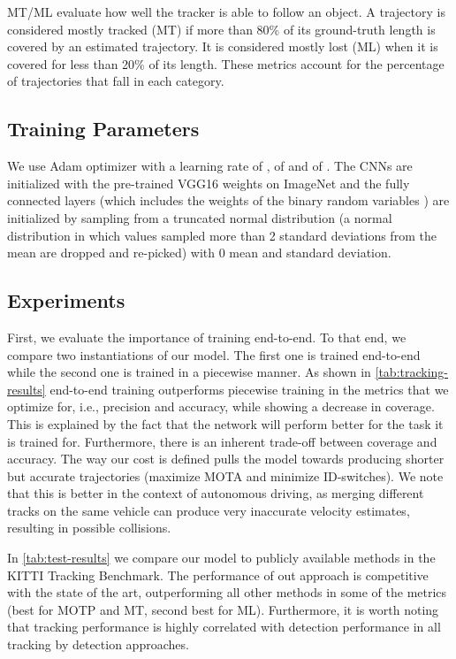 \documentclass[letterpaper, 10 pt, conference]{ieeeconf}  \pdfminorversion=4
\begin{document}
MT/ML evaluate how well the tracker is able to follow an object. A trajectory is considered mostly tracked (MT) if more than 80\% of its ground-truth length is covered by an estimated trajectory. It is considered mostly lost (ML) when it is covered for less than 20\% of its length. These metrics account for the percentage of trajectories that fall in each category.

\subsection{Training Parameters}

We use Adam optimizer \cite{kingma2014adam} with a learning rate of ,  of  and  of . The CNNs are initialized with the pre-trained VGG16 weights on ImageNet and the fully connected layers (which includes the weights of the binary random variables ) are initialized by sampling from a truncated normal distribution (a normal distribution in which values sampled more than 2 standard deviations from the mean are dropped and re-picked) with 0 mean and  standard deviation.

\subsection{Experiments}



\vspace{0.1cm}
First, we evaluate the importance of training  end-to-end. To that end, we compare two instantiations of our model. The first one is trained end-to-end while the second one is trained in a piecewise manner. As shown in  \autoref{tab:tracking-results} end-to-end training  outperforms  piecewise training in the metrics that we optimize for,  i.e., precision and accuracy, while showing a decrease in coverage. This is explained by the fact that the network will perform better for the task it is trained for. Furthermore, there is an inherent trade-off between coverage and accuracy. The way our cost is defined pulls the model towards producing shorter but accurate trajectories (maximize MOTA and minimize ID-switches). We note that this is better in the context of autonomous driving, as merging different tracks on the same vehicle can produce very inaccurate velocity estimates, resulting in possible collisions.

\vspace{0.1cm}
In \autoref{tab:test-results} we compare our model to publicly available methods in the KITTI Tracking Benchmark. The performance of out approach is competitive with the state of the art, outperforming all other methods in some of the metrics (best for MOTP and MT, second best for ML). Furthermore, it is worth noting that tracking performance is highly correlated with detection performance in all  tracking by detection approaches.
\end{document}
